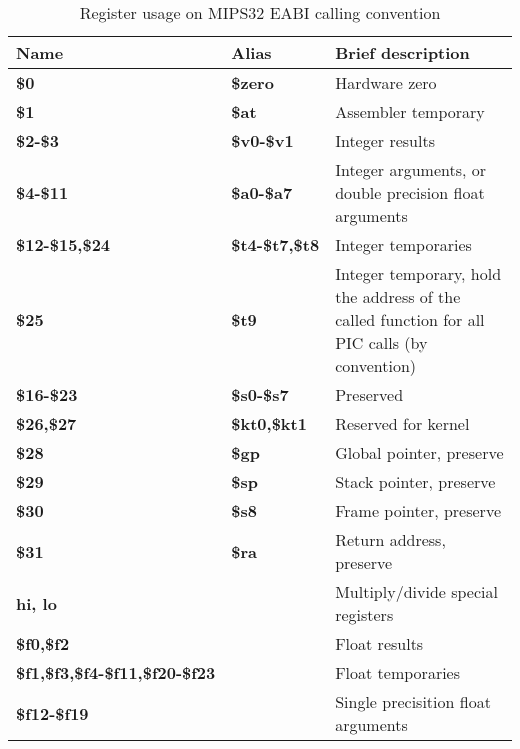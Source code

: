 \begin{table}[h]
\begin{tabular*}{0.95\textwidth}{lll}
Name                                   & Alias                & Brief description\\
\hline
{\bf \$0}                              & {\bf \$zero}         & Hardware zero \\
{\bf \$1}                              & {\bf \$at}           & Assembler temporary \\
{\bf \$2-\$3}                          & {\bf \$v0-\$v1}      & Integer results \\
{\bf \$4-\$11}                         & {\bf \$a0-\$a7}      & Integer arguments, or double precision float arguments\\
{\bf \$12-\$15,\$24}                   & {\bf \$t4-\$t7,\$t8} & Integer temporaries \\
{\bf \$25}                             & {\bf \$t9}           & Integer temporary, hold the address of the called function for all PIC calls (by convention) \\
{\bf \$16-\$23}                        & {\bf \$s0-\$s7}      & Preserved \\
{\bf \$26,\$27}                        & {\bf \$kt0,\$kt1}    & Reserved for kernel \\
{\bf \$28}                             & {\bf \$gp}           & Global pointer, preserve \\
{\bf \$29}                             & {\bf \$sp}           & Stack pointer, preserve \\
{\bf \$30}                             & {\bf \$s8}           & Frame pointer, preserve \\
{\bf \$31}                             & {\bf \$ra}           & Return address, preserve \\
{\bf hi, lo}                           &                      & Multiply/divide special registers \\
{\bf \$f0,\$f2}                        &                      & Float results \\
{\bf \$f1,\$f3,\$f4-\$f11,\$f20-\$f23} &                      & Float temporaries \\
{\bf \$f12-\$f19}                      &                      & Single precisition float arguments \\
\end{tabular*}
\caption{Register usage on MIPS32 EABI calling convention}
\end{table}

